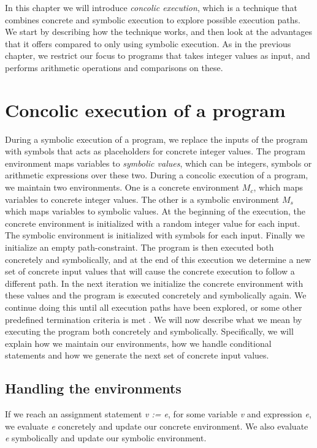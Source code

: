 In this chapter we will introduce \emph{concolic execution}, which is a technique that combines concrete and symbolic execution to explore possible execution paths. We start by describing how the technique works, and then look at the advantages that it offers compared to only using symbolic execution. As in the previous chapter, we restrict our focus to programs that takes integer values as input, and performs arithmetic operations and comparisons on these. 

\section{Concolic execution of a program}
	During a symbolic execution of a program, we replace the inputs of the program with symbols that acts as placeholders for concrete integer values. The program environment maps variables to \emph{symbolic values}, which can be integers, symbols or arithmetic expressions over these two. During a concolic execution of a program, we maintain two environments. One is a concrete environment $M_c$, which maps variables to concrete integer values. The other is a symbolic environment $M_s$ which maps variables to symbolic values. At the beginning of the execution, the concrete environment is initialized with a random integer value for each input. The symbolic environment is initialized with symbols for each input. Finally we initialize an empty path-constraint. The program is then executed both concretely and symbolically, and at the end of this execution we determine a new set of concrete input values that will cause the concrete execution to follow a different path. In the next iteration we initialize the concrete environment with these values and the program is executed concretely and symbolically again. We continue doing this until all execution paths have been explored, or some other predefined termination criteria is met \citep{Godefroid:2005:DDA:1064978.1065036}. \newpage \noindent We will now describe what we mean by executing the program both concretely and symbolically. Specifically, we will explain how we maintain our environments, how we handle conditional statements and how we generate the next set of concrete input values.
	
	\subsection{Handling the environments} 
	
	If we reach an assignment statement \textsl{v := e}, for some variable \textsl{v} and expression \textsl{e}, we evaluate \textsl{e} concretely and update our concrete environment. We also evaluate \textsl{e} symbolically and update our symbolic environment.  
	
